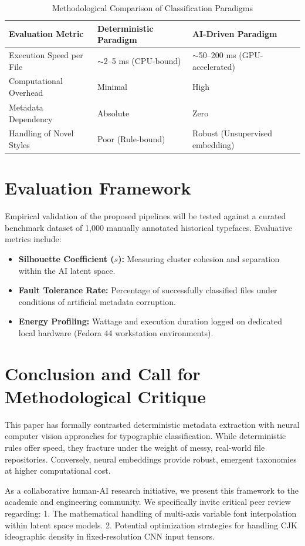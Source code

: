 \documentclass[11pt, onecolumn, a4paper]{article}
\begin{document}
\begin{table}[htbp]
\centering
\caption{Methodological Comparison of Classification Paradigms}
\begin{tabular}{@{}lll@{}}
\toprule
\textbf{Evaluation Metric} & \textbf{Deterministic Paradigm} & \textbf{AI-Driven Paradigm} \\ \midrule
Execution Speed per File & $\sim$2–5 ms (CPU-bound)       & $\sim$50–200 ms (GPU-accelerated) \\
Computational Overhead   & Minimal                        & High                              \\
Metadata Dependency      & Absolute                       & Zero                              \\
Handling of Novel Styles & Poor (Rule-bound)              & Robust (Unsupervised embedding)   \\ \hline
\end{tabular}
\end{table}

\section{Evaluation Framework}
Empirical validation of the proposed pipelines will be tested against a curated benchmark dataset of 1,000 manually annotated historical typefaces. Evaluative metrics include:
\begin{itemize}
    \item \textbf{Silhouette Coefficient ($s$):} Measuring cluster cohesion and separation within the AI latent space.
    \item \textbf{Fault Tolerance Rate:} Percentage of successfully classified files under conditions of artificial metadata corruption.
    \item \textbf{Energy Profiling:} Wattage and execution duration logged on dedicated local hardware (Fedora 44 workstation environments).
\end{itemize}

\section{Conclusion and Call for Methodological Critique}
This paper has formally contrasted deterministic metadata extraction with neural computer vision approaches for typographic classification. While deterministic rules offer speed, they fracture under the weight of messy, real-world file repositories. Conversely, neural embeddings provide robust, emergent taxonomies at higher computational cost. 

As a collaborative human-AI research initiative, we present this framework to the academic and engineering community. We specifically invite critical peer review regarding:
1. The mathematical handling of multi-axis variable font interpolation within latent space models.
2. Potential optimization strategies for handling CJK ideographic density in fixed-resolution CNN input tensors.
\end{document}
